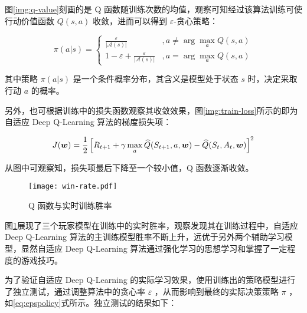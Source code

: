 图\ref{img:q-value}刻画的是 Q 函数随训练次数的均值，观察可知经过该算法训练可使行动价值函数 $Q(s,a)$ 收敛，进而可以得到 $\varepsilon$-贪心策略：

\begin{equation}\label{eq:epspolicy}
    \pi(a|s)=
    \begin{cases}
        \frac{\varepsilon}{|\mathcal A(s)|}&, a\neq\arg\max_aQ(s,a)\\
        1-\varepsilon+\frac{\varepsilon}{|\mathcal A(s)|}&, a=\arg\max_aQ(s,a)
    \end{cases}
\end{equation}

其中策略 $\pi(a|s)$ 是一个条件概率分布，其含义是模型处于状态 $s$ 时，决定采取行动 $a$ 的概率。

另外，也可根据训练中的损失函数观察其收敛效果，图\ref{img:train-loss}所示的即为 自适应 Deep Q-Learning 算法的梯度损失项：

\begin{equation}
    \centering
    J(\boldsymbol{w}) = \frac{1}{2}\left[R_{t+1}+\gamma\max_a\widehat{Q}(S_{t+1},a,\boldsymbol{w})-\widehat{Q}(S_t,A_t,\boldsymbol{w})\right]^2
\end{equation}

从图中可观察知，损失项最后下降至一个较小值，Q 函数逐渐收敛。

\begin{figure}[H]
    \centering
    \texttt{[image: win-rate.pdf]}
    \caption{Q 函数与实时训练胜率}\label{img:win-rate}
\end{figure}

图\ref{img:win-rate}展现了三个玩家模型在训练中的实时胜率，观察发现其在训练过程中，自适应 Deep Q-Learning 算法的主训练模型胜率不断上升，远优于另外两个辅助学习模型，显然自适应 Deep Q-Learning 算法通过强化学习的思想学习和掌握了一定程度的游戏技巧。

为了验证自适应 Deep Q-Learning 的实际学习效果，使用训练出的策略模型进行了独立测试，通过调整算法中的贪心率 $\varepsilon$ ，从而影响到最终的实际决策策略 $\pi$ ，如\ref{eq:epspolicy}式所示。独立测试的结果如下：

